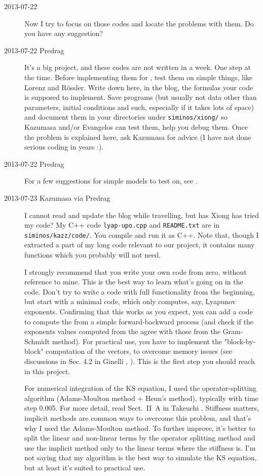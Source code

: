 \begin{description}
\item[2013-07-22 \XD]
Now I try to focus on those codes and locate the problems with them.
Do you have any suggestion?

\item[2013-07-22 Predrag] It's a big project, and these codes are not written
in a week. One step at the time. Before implementing them for \KS,
test them on simple things, like Lorenz and R\"ossler. Write down here,
in the blog, the
formulas your code is supposed to implement. Save programs
(but usually not data other than parameters, initial conditions and such,
especially if it takes lots of space)
and document them in your
directories under \texttt{siminos/xiong/} so Kazumasa and/or Evangelos
can test them, help you debug them. Once the problem is explained
here, ask Kazumasa for advice (I have not done serious coding in years :).

\item[2013-07-22 Predrag] For a few suggestions for simple models to
test on, see .

\item[2013-07-23 Kazumasa via Predrag]
I cannot read and update the blog while travelling, but has Xiong has
tried my code? My C++  code \texttt{lyap-upo.cpp} and \texttt{README.txt}
are in \texttt{siminos/kazz/code/}. You compile and run it as C++. Note
that, though I extracted a part of my long code relevant to our project,
it contains many functions which you probably will not need.

I strongly recommend that you write your own code from zero, without
reference to mine. This is the best way to learn what's going on in
the code. Don't try to write a code with full functionality from the
beginning, but start with a minimal code, which only computes, say,
Lyapunov exponents.
Confirming that this works as you expect, you can add a code to compute
the {\cLvs} from a simple forward-backward process (and
check if the exponents values computed from the {\cLvs}
agree with those from the Gram-Schmidt method). For practical use,
you have to implement the "block-by-block" computation of the
vectors, to overcome memory issues (see discussions in Sec. 4.2 in
Ginelli \etal{}, ). This is
the first step you should reach in this project.

For numerical integration of the KS equation, I used the
operator-splitting algorithm (Adams-Moulton method + Heun's method),
typically with time step 0.005. For more detail, read Sect.~II~A in
Takeuchi \etal{}. Stiffness matters, implicit methods are
common ways to overcome this problem,
 and that's why I used the Adams-Moulton method. To further improve,
it's better to split the linear and non-linear terms
 by the operator splitting method and use the implicit method only to
 the linear terms where the stiffness is.
I'm not saying that my algorithm is the best way to simulate the KS
equation, but at least it's suited to practical use.



\end{description}
